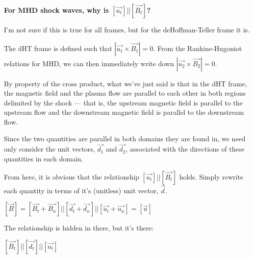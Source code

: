\textbf{For MHD shock waves, why is $\left[\vec{u_{t}}\right] ||
\left[\vec{B_{t}}\right]$?}

I'm not sure if this is true for all frames, but for the
deHoffman-Teller frame it is.

The dHT frame is defined such that $\left| \vec{u_{1}} \times
\vec{B_{1}}\right| =
0$. From the Rankine-Hugoniot relations for MHD, we can then immediately
write down $\left| \vec{u_{2}} \times \vec{B_{2}}\right| = 0$.

By property of the cross product, what we've just said is that in the
dHT frame, the magnetic field and the plasma flow are parallel to each
other in both regions delimited by the shock --- that is, the upstream
magnetic field is parallel to the upstream flow and the downstream
magnetic field is parallel to the downstream flow.

Since the two quantities are parallel in both domains they are found in, we
need only consider the unit vectors, $\vec{d_{1}}$ and $\vec{d_{2}}$,
associated with the directions of these quantities in each domain.

From here, it is obvious that the relationship $\left[\vec{u_{t}}\right] ||
\left[\vec{B_{t}}\right]$ holds. Simply rewrite each quantity in terms
of it's (unitless) unit vector, $\vec{d}$.
\begin{center}
\begin{math}
  \left[ \vec{B} \right] = \left[ \vec{B_{t}} + \vec{B_{n}} \right] ||
  \left[ \vec{d_{t}} + \vec{d_{n}} \right] || \left[
  \vec{u_{t}}+\vec{u_{n}} \right] = \left[ \vec{u} \right]
\end{math}
\end{center}

The relationship is hidden in there, but it's there:
\begin{center}
  \begin{math}
    \left[ \vec{B_{t}} \right] || \left[ \vec{d_{t}} \right] || \left[
    \vec{u_{t}} \right]
  \end{math}
\end{center}

